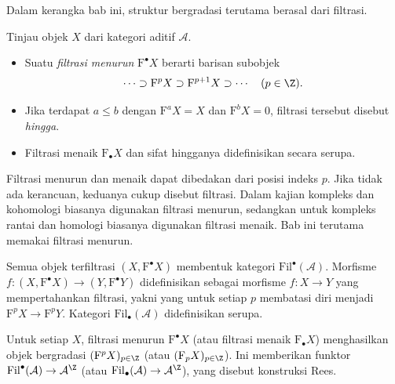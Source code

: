 Dalam kerangka bab ini, struktur bergradasi terutama berasal dari filtrasi.

\begin{definisi}\label{def:filtration}
	Tinjau objek $X$ dari kategori aditif $\mathcal{A}$.
	\begin{itemize}
		\item Suatu \emph{filtrasi menurun} $\mathrm{F}^\bullet X$ berarti
		barisan subobjek
		\[ \cdots \supset \mathrm{F}^p X \supset \mathrm{F}^{p+1} X \supset \cdots \quad (p \in \Z). \]
		\item Jika terdapat $a\leq b$ dengan $\mathrm{F}^aX=X$ dan
		$\mathrm{F}^bX=0$, filtrasi tersebut disebut \emph{hingga}.
		\item Filtrasi menaik $\mathrm{F}_\bullet X$ dan sifat hingganya
		didefinisikan secara serupa.
	\end{itemize}
\end{definisi}

Filtrasi menurun dan menaik dapat dibedakan dari posisi indeks $p$. Jika tidak
ada kerancuan, keduanya cukup disebut filtrasi. Dalam kajian kompleks dan
kohomologi biasanya digunakan filtrasi menurun, sedangkan untuk kompleks
rantai dan homologi biasanya digunakan filtrasi menaik. Bab ini terutama
memakai filtrasi menurun.

Semua objek terfiltrasi $(X,\mathrm{F}^\bullet X)$ membentuk kategori
$\mathrm{Fil}^\bullet(\mathcal{A})$. Morfisme
$f:(X,\mathrm{F}^\bullet X)\to(Y,\mathrm{F}^\bullet Y)$ didefinisikan sebagai
morfisme $f:X\to Y$ yang mempertahankan filtrasi, yakni yang untuk setiap $p$
membatasi diri menjadi $\mathrm{F}^pX\to\mathrm{F}^pY$. Kategori
$\mathrm{Fil}_\bullet(\mathcal{A})$ didefinisikan serupa.

Untuk setiap $X$, filtrasi menurun $\mathrm{F}^\bullet X$ (atau filtrasi
menaik $\mathrm{F}_\bullet X$) menghasilkan objek bergradasi
$(\mathrm{F}^pX)_{p\in\Z}$ (atau $(\mathrm{F}_pX)_{p\in\Z}$). Ini memberikan
funktor $\mathrm{Fil}^\bullet(\mathcal{A})\to\mathcal{A}^{\Z}$ (atau
$\mathrm{Fil}_\bullet(\mathcal{A})\to\mathcal{A}^{\Z}$), yang disebut
konstruksi Rees.

